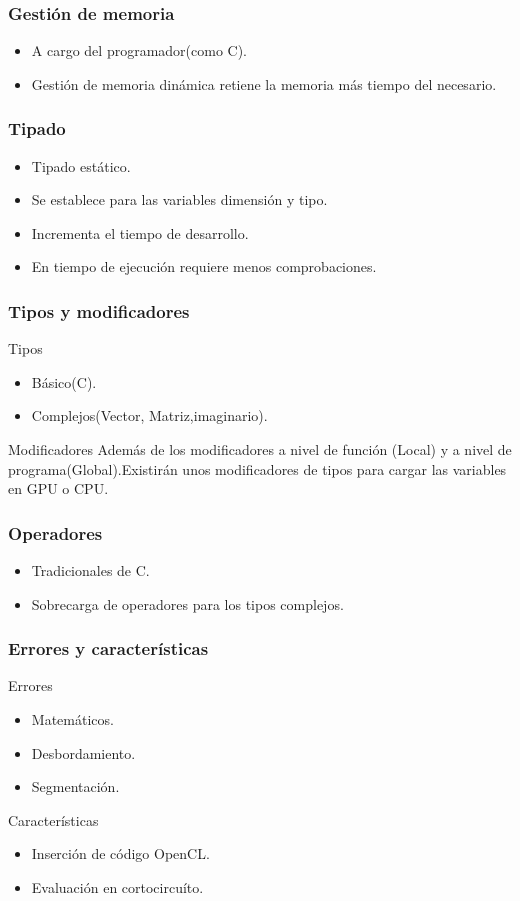 \documentclass{beamer}
\begin{document}
\begin{frame}
\frametitle{Gestión de memoria}
\begin{itemize}
\item A cargo del programador(como C).
\item Gestión de memoria dinámica retiene la memoria
más tiempo del necesario.
\end{itemize}
\end{frame}
\begin{frame}
\frametitle{Tipado}
\begin{itemize}
\item Tipado estático.
\item Se establece para las variables dimensión y tipo.
\item Incrementa el tiempo de desarrollo.
\item En tiempo de ejecución requiere menos comprobaciones.
\end{itemize}
\end{frame}
\begin{frame}
\frametitle{Tipos y modificadores}
\begin{block}{Tipos}
\begin{itemize}
\item Básico(C).
\item Complejos(Vector, Matriz,imaginario).
\end{itemize}
\end{block}
\pause
\begin{block}{Modificadores}
Además de los modificadores a nivel de función (Local) y a nivel de programa(Global).Existirán unos modificadores de tipos para cargar las variables en GPU o CPU.
\end{block}
\end{frame}
\begin{frame}
\frametitle{Operadores}
\begin{itemize}
\item Tradicionales de C.
\item Sobrecarga de operadores para los tipos complejos.
\end{itemize}
\end{frame}
\begin{frame}
\frametitle{Errores y características}
\begin{block}{Errores}
\begin{itemize}
\item Matemáticos.
\item Desbordamiento.
\item Segmentación.
\end{itemize}
\end{block}
\pause
\begin{block}{Características}
\begin{itemize}
\item Inserción de código OpenCL.
\item Evaluación en cortocircuíto.
\end{itemize}
\end{block}
\end{frame}
\end{document}
